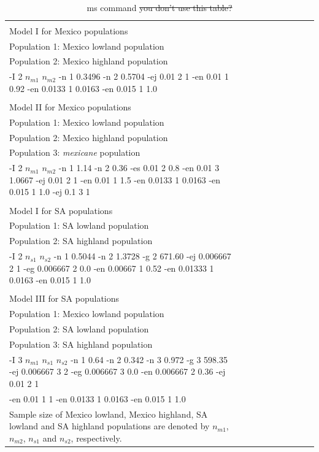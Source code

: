 \renewcommand{\arraystretch}{1.1}
\begin{table}[h]

\begin{center}
 \caption[]{ms command \st{you don't use this table?}\hspace*{13.3cm}}
  \textbf{}\\[-2mm]
{\fontsize{7}{11}\sf
    \begin{tabular}{llcccccccl} \hline\hline
       & & \\[-3mm]
     Model I for Mexico  populations   \\
     Population 1: Mexico lowland population   \\
     Population 2: Mexico highland population   \\
  -I 2 $n_{m1}$ $n_{m2}$ -n 1 0.3496 -n 2 0.5704 -ej 0.01 2 1 -en 0.01 1 0.92 -en 0.0133 1 0.0163 -en 0.015 1 1.0 \\ 
      \hline
    & & \\[-3mm]
     Model II for Mexico  populations   \\
     Population 1: Mexico lowland population   \\
     Population 2: Mexico highland population   \\
     Population 3: \emph{mexicane} population   \\
-I 2 $n_{m1}$ $n_{m2}$ -n 1 1.14 -n 2 0.36 -es 0.01 2 0.8 -en 0.01 3 1.0667 -ej 0.01 2 1 -en 0.01 1 1.5 -en 0.0133 1 0.0163 -en 0.015 1 1.0 -ej 0.1 3 1 \\ 
      \hline
    & & \\[-3mm]
    Model I for SA  populations   \\
     Population 1: SA lowland population   \\
     Population 2: SA highland population   \\
  -I 2 $n_{s1}$ $n_{s2}$ -n 1 0.5044 -n 2 1.3728 -g 2 671.60 -ej 0.006667 2 1 -eg 0.006667 2 0.0 -en 0.00667 1 0.52 -en 0.01333 1 0.0163 -en 0.015 1 1.0 \\ 
      \hline
    & & \\[-3mm]
    Model III for SA  populations   \\
    Population 1: Mexico lowland population   \\
     Population 2: SA lowland population   \\
     Population 3: SA highland population   \\
  -I 3 $n_{m1}$ $n_{s1}$ $n_{s2}$ -n 1 0.64 -n 2 0.342 -n 3 0.972 -g 3 598.35 -ej 0.006667 3 2 -eg 0.006667 3 0.0 -en 0.006667 2 0.36 -ej 0.01 2 1\\
   -en 0.01 1 1 -en 0.0133 1 0.0163 -en 0.015 1 1.0 \\  [1mm]
    \hline\hline
\multicolumn{1}{l}{Sample size of Mexico lowland, Mexico highland, SA lowland and SA highland populations are denoted by $n_{m1}$, $n_{m2}$, $n_{s1}$ and $n_{s2}$, respectively.}\\
    \end{tabular}
    \label{commandline}  %
}
\end{center}
\end{table}
